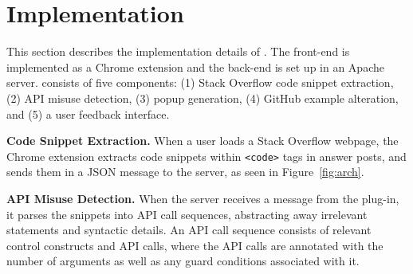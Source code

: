 \section{Implementation}
\label{sec:implementation}
This section describes the implementation details of {\soa}. The front-end is implemented as a Chrome extension and the back-end is set up in an Apache server. {\soa} consists of five components: (1) Stack Overflow code snippet extraction, (2) API misuse detection, (3) popup generation, (4) GitHub example alteration, and (5) a user feedback interface.

{\bf Code Snippet Extraction.} When a user loads a Stack Overflow webpage, the Chrome extension extracts code snippets within {\tt <code>} tags in answer posts, and sends them in a JSON message to the server, as seen in Figure~\ref{fig:arch}.

{\bf API Misuse Detection.} When the server receives a message from the plug-in, it parses the snippets into API call sequences, abstracting away irrelevant statements and syntactic details. An API call sequence consists of relevant control constructs and API calls, where the API calls are annotated with the number of arguments as well as any guard conditions associated with it.

